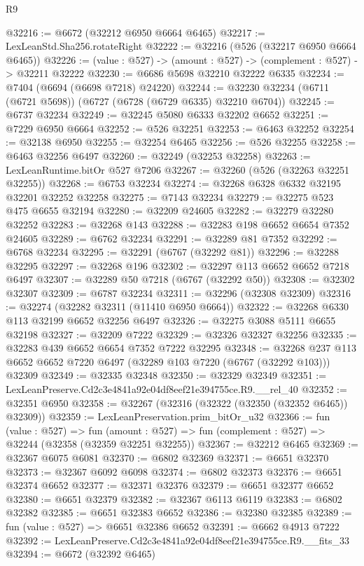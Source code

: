 \begin{lexlean}{R9}
\begin{coremodule}
@32216 := @6672 (@32212 @6950 @6664 @6465)
@32217 := LexLeanStd.Sha256.rotateRight
@32222 := @32216 (@526 (@32217 @6950 @6664 @6465))
@32226 := (value : @527) -> (amount : @527) -> (complement : @527) -> @32211 @32222
@32230 := @6686 @5698 @32210 @32222 @6335
@32234 := @7404 (@6694 (@6698 @7218) @24220)
@32244 := @32230 @32234 (@6711 (@6721 @5698)) (@6727 (@6728 (@6729 @6335) @32210 @6704))
@32245 := @6737 @32234
@32249 := @32245 @5080 @6333 @32202 @6652
@32251 := @7229 @6950 @6664
@32252 := @526 @32251
@32253 := @6463 @32252
@32254 := @32138 @6950
@32255 := @32254 @6465
@32256 := @526 @32255
@32258 := @6463 @32256 @6497
@32260 := @32249 (@32253 @32258)
@32263 := LexLeanRuntime.bitOr @527 @7206
@32267 := @32260 (@526 (@32263 @32251 @32255))
@32268 := @6753 @32234
@32274 := @32268 @6328 @6332 @32195 @32201 @32252 @32258
@32275 := @7143 @32234
@32279 := @32275 @523 @475 @6655 @32194
@32280 := @32209 @24605
@32282 := @32279 @32280 @32252
@32283 := @32268 @143
@32288 := @32283 @198 @6652 @6654 @7352 @24605
@32289 := @6762 @32234
@32291 := @32289 @81 @7352
@32292 := @6768 @32234
@32295 := @32291 (@6767 (@32292 @81))
@32296 := @32288 @32295
@32297 := @32268 @196
@32302 := @32297 @113 @6652 @6652 @7218 @6497
@32307 := @32289 @50 @7218 (@6767 (@32292 @50))
@32308 := @32302 @32307
@32309 := @6787 @32234
@32311 := @32296 (@32308 @32309)
@32316 := @32274 (@32282 @32311 (@11410 @6950 @6664))
@32322 := @32268 @6330 @113 @32199 @6652 @32256 @6497
@32326 := @32275 @3088 @5111 @6655 @32198
@32327 := @32209 @7222
@32329 := @32326 @32327 @32256
@32335 := @32283 @439 @6652 @6654 @7352 @7222 @32295
@32348 := @32268 @237 @113 @6652 @6652 @7220 @6497 (@32289 @103 @7220 (@6767 (@32292 @103))) @32309
@32349 := @32335 @32348
@32350 := @32329 @32349
@32351 := LexLeanPreserve.Cd2c3e4841a92e04df8eef21e394755ce.R9.__rel_40
@32352 := @32351 @6950
@32358 := @32267 (@32316 (@32322 (@32350 (@32352 @6465)) @32309))
@32359 := LexLeanPreservation.prim_bitOr_u32
@32366 := fun (value : @527) =>
  fun (amount : @527) => fun (complement : @527) => @32244 (@32358 (@32359 @32251 @32255))
@32367 := @32212 @6465
@32369 := @32367 @6075 @6081
@32370 := @6802 @32369
@32371 := @6651 @32370
@32373 := @32367 @6092 @6098
@32374 := @6802 @32373
@32376 := @6651 @32374 @6652
@32377 := @32371 @32376
@32379 := @6651 @32377 @6652
@32380 := @6651 @32379
@32382 := @32367 @6113 @6119
@32383 := @6802 @32382
@32385 := @6651 @32383 @6652
@32386 := @32380 @32385
@32389 := fun (value : @527) => @6651 @32386 @6652
@32391 := @6662 @4913 @7222
@32392 := LexLeanPreserve.Cd2c3e4841a92e04df8eef21e394755ce.R9.__fits_33
@32394 := @6672 (@32392 @6465)

\end{coremodule}
\end{lexlean}
